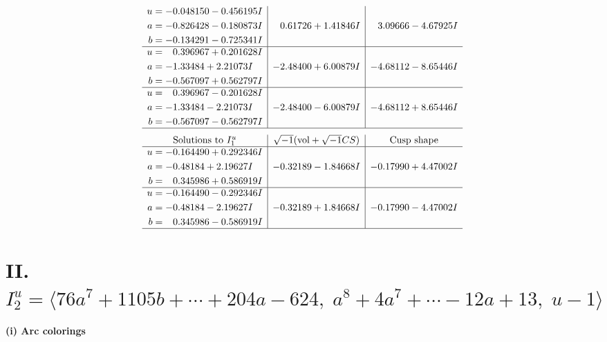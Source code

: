 \documentclass[1p]{elsarticle_modified}
\theoremstyle{definition}
\newcommand{\I}{\sqrt{-1}}
\begin{document}
$$\begin{array}{c|c|c}
\begin{aligned}
u &= -0.048150 - 0.456195 I \\
a &= -0.826428 - 0.180873 I \\
b &= -0.134291 - 0.725341 I\end{aligned}
 & \phantom{-}0.61726 + 1.41846 I & \phantom{-}3.09666 - 4.67925 I \\ \hline\begin{aligned}
u &= \phantom{-}0.396967 + 0.201628 I \\
a &= -1.33484 + 2.21073 I \\
b &= -0.567097 + 0.562797 I\end{aligned}
 & -2.48400 + 6.00879 I & -4.68112 - 8.65446 I \\ \hline\begin{aligned}
u &= \phantom{-}0.396967 - 0.201628 I \\
a &= -1.33484 - 2.21073 I \\
b &= -0.567097 - 0.562797 I\end{aligned}
 & -2.48400 - 6.00879 I & -4.68112 + 8.65446 I\\
 \hline 
 \end{array}$$\newpage$$\begin{array}{c|c|c}  
\text{Solutions to }I^u_{1}& \I (\text{vol} + \sqrt{-1}CS) & \text{Cusp shape}\\
 \hline 
\begin{aligned}
u &= -0.164490 + 0.292346 I \\
a &= -0.48184 + 2.19627 I \\
b &= \phantom{-}0.345986 + 0.586919 I\end{aligned}
 & -0.32189 - 1.84668 I & -0.17990 + 4.47002 I \\ \hline\begin{aligned}
u &= -0.164490 - 0.292346 I \\
a &= -0.48184 - 2.19627 I \\
b &= \phantom{-}0.345986 - 0.586919 I\end{aligned}
 & -0.32189 + 1.84668 I & -0.17990 - 4.47002 I\\
 \hline 
 \end{array}$$\newpage\newpage\renewcommand{\arraystretch}{1}
\centering \section*{II. $I^u_{2}= \langle 76 a^7+1105 b+\cdots+204 a-624,\;a^8+4 a^7+\cdots-12 a+13,\;u-1 \rangle$}
\flushleft \textbf{(i) Arc colorings}\\
\end{document}
